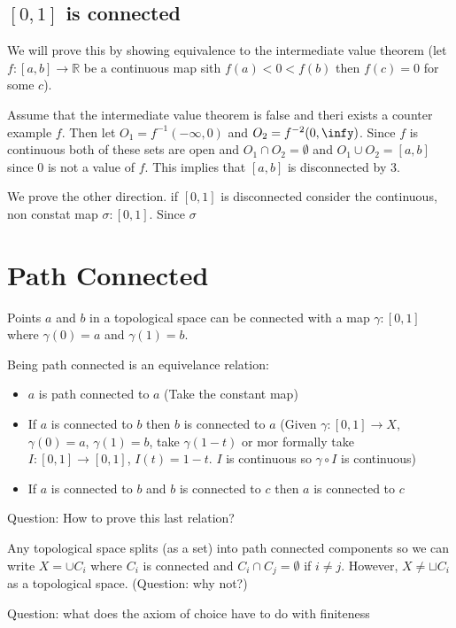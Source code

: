 \documentclass{homework}
\newcommand{\RR}{\mathbb{R}}
\begin{document}
\subsection{$[0,1]$ is connected}

We will prove this by showing equivalence to the intermediate value theorem (let $f:[a,b] \rightarrow \RR$ be a continuous map sith $f(a) < 0 < f(b)$ then $f(c) = 0$ for some $c$). 


Assume that the intermediate value theorem is false and theri exists a counter example $f$. Then let $O_1 = f^{-1}(-\infty,0)$ and $O_2 = f^{-2}(0,\infy)$. Since $f$ is continuous both of these sets are open and $O_1 \cap O_2 = \emptyset$ and $O_1 \cup O_2 = [a,b]$ since $0$ is not a value of $f$. This implies that $[a,b]$ is disconnected by $3$.

We prove the other direction. if $[0,1]$ is disconnected consider the continuous, non constat map $\sigma: [0,1]$. Since $\sigma$ 




\section{Path Connected}
Points $a$ and $b$ in a topological space can be connected with a map $\gamma : [0,1]$ where $\gamma(0) = a$ and $\gamma(1) = b$. 

Being path connected is an equivelance relation:
\begin{itemize}
    \item $a$ is path connected to $a$ (Take the constant map)
    \item If $a$ is connected to $b$ then $b$ is connected to $a$ (Given $\gamma : [0,1] \rightarrow X$, $\gamma (0) = a$, $\gamma (1) = b$, take $\gamma (1-t)$ or mor formally take $I : [0,1] \rightarrow [0,1]$, $I(t) = 1- t$. $I$ is continuous so $\gamma \circ I$ is continuous)
    \item If $a$ is connected to $b$ and $b$ is connected to $c$ then $a$ is connected to $c$

\end{itemize}

Question: How to prove this last relation?


Any topological space splits (as a set) into path connected components so we can write $X = \cup C_i$ where $C_i$ is connected and $C_i \cap C_j = \emptyset$ if $i \neq j$. However, $X \neq \sqcup C_i$ as a topological space. (Question: why not?)

Question: what does the axiom of choice have to do with finiteness
\end{document}
